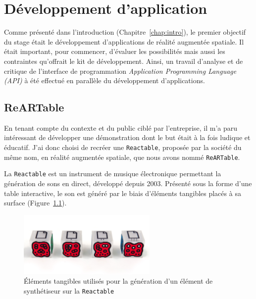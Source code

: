 \chapter{Développement d'application}
\label{chap:app}

Comme présenté dans l'introduction (Chapitre~\ref{chap:intro}), le premier objectif du stage était le développement d'applications de réalité augmentée spatiale. Il était important, pour commencer, d'évaluer les possibilités mais aussi les contraintes qu'offrait le kit de développement. 
Ainsi, un travail d'analyse et de critique de l'interface de programmation \emph{Application Programming Language (API)} à été effectué en parallèle du développement d'applications.

\section{ReARTable}
\label{sec:reartable}
En tenant compte du contexte et du public ciblé par l'entreprise, il m'a paru intéressant de développer une démonstration dont le but était à la fois ludique et éducatif. J'ai donc choisi de recréer une \texttt{Reactable}\cite{reactable}, proposée par la société du même nom, en réalité augmentée spatiale, que nous avons nommé \texttt{ReARTable}.

La \texttt{Reactable} est un instrument de musique électronique permettant la génération de sons en direct, développé depuis 2003. Présenté sous la forme d'une table interactive, le son est généré par le biais d'éléments tangibles placés à sa surface (Figure~\ref{fig:reactelem}). 

\begin{figure}[H]
\centering
\includegraphics[width=0.6\textwidth]{images/reactelements}
\caption{Éléments tangibles utilisés pour la génération d'un élément de synthétiseur sur la \texttt{Reactable}\protect\footnotemark}
\label{fig:reactelem}
\end{figure}


